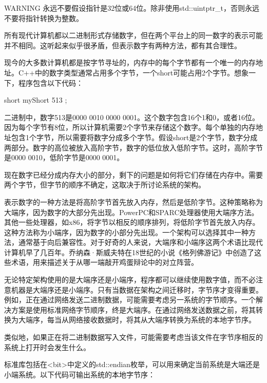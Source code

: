 \begin{myWarning}{WARNING}
永远不要假设指针是32位或64位。除非使用std::uintptr\_t，否则永远不要将指针转换为整数。
\end{myWarning}


所有现代计算机都以二进制形式存储数字，但在两个平台上的同一数字的表示可能并不相同。这听起来似乎很矛盾，但表示数字有两种方法，都有其合理性。

现今的大多数计算机都是按字节寻址的，内存中的每个字节都有一个唯一的内存地址。C++中的数字类型通常占用多个字节，一个short可能占用2个字节。想象一下，程序包含以下代码：

\begin{cpp}
short myShort { 513 };
\end{cpp}

二进制中，数字513是0000 0010 0000 0001。这个数字包含16个1和0，或者16位。因为每个字节有8位，所以计算机需要2个字节来存储这个数字。每个单独的内存地址包含1个字节，所以需要将数字分成多个字节。假设short是2个字节，数字分成两部分。数字的高位被放入高阶字节，数字的低位放入低阶字节。这时，高阶字节是0000 0010，低阶字节是0000 0001。

现在数字已经分成内存大小的部分，剩下的问题是如何将它们存储在内存中。需要两个字节，但字节的顺序不确定，这取决于所讨论系统的架构。

表示数字的一种方法是将高阶字节首先放入内存，然后是低阶字节。这种策略称为大端序，因为数字的大部分先出现。PowerPC和SPARC处理器使用大端序方法。其他一些处理器，如x86，将字节以相反的顺序排列，将低阶字节首先放入内存。这种方法称为小端序，因为数字的小部分先出现。一个架构可以选择其中一种方法，通常基于向后兼容性。对于好奇的人来说，大端序和小端序这两个术语比现代计算机早了几百年。乔纳森·斯威夫特在18世纪的小说《格列佛游记》中创造了这些术语，用来描述关于从哪一端敲开鸡蛋辩论中的对立阵营。

无论特定架构使用的是大端序还是小端序，程序都可以继续使用数字值，而不必注意机器是大端序还是小端序。只有当数据在架构之间迁移时，字节序才变得重要。例如，正在通过网络发送二进制数据，可能需要考虑另一系统的字节顺序。一个解决方案是使用标准网络字节顺序，终是大端序。在通过网络发送数据之前，将其转换为大端序，每当从网络接收数据时，将其从大端序转换为系统的本地字节序。

类似地，如果正在将二进制数据写入文件，可能需要考虑当该文件在字节序相反的系统上打开时会发生什么。

标准库包括在<bit>中定义的std::endian枚举，可以用来确定当前系统是大端还是小端系统。以下代码可输出系统的本地字节序：

